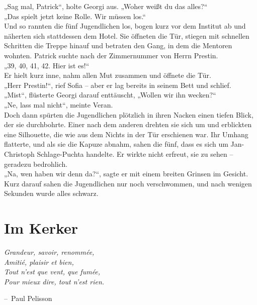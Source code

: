 \documentclass[oneside]{memoir}
\makeatletter
\newenvironment{chapquote}[2][2em]
  {\setlength{\@tempdima}{#1}%
   \def\chapquote@author{#2}%
   \parshape 1 \@tempdima \dimexpr\textwidth-2\@tempdima\relax%
   \itshape}
  {\par\normalfont\hfill--\ \chapquote@author\hspace*{\@tempdima}\par\bigskip}
\makeatother
\begin{document}
„Sag mal, Patrick“, holte Georgi aus. „Woher weißt du das alles?“ \\
„Das spielt jetzt keine Rolle. Wir müssen los.“ \\
Und so rannten die fünf Jugendlichen los, bogen kurz vor dem Institut ab und näherten sich stattdessen dem Hotel. Sie öffneten die Tür, stiegen mit schnellen Schritten die Treppe hinauf und betraten den Gang, in dem die Mentoren wohnten. Patrick suchte nach der Zimmernummer von Herrn Prestin. \\
„39, 40, 41, 42. Hier ist es!“ \\
Er hielt kurz inne, nahm allen Mut zusammen und öffnete die Tür. \\
„Herr Prestin!“, rief Sofia – aber er lag bereits in seinem Bett und schlief. \\
„Mist“, flüsterte Georgi darauf enttäuscht, „Wollen wir ihn wecken?“ \\
„Ne, lass mal nicht“, meinte Veran. \\
Doch dann spürten die Jugendlichen plötzlich in ihren Nacken einen tiefen Blick, der sie durchbohrte. Einer nach dem anderen drehten sie sich um und erblickten eine Silhouette, die wie aus dem Nichts in der Tür erschienen war. Ihr Umhang flatterte, und als sie die Kapuze abnahm, sahen die fünf, dass es sich um Jan-Christoph Schlage-Puchta handelte. Er wirkte nicht erfreut, sie zu sehen – geradezu bedrohlich. \\
„Na, wen haben wir denn da?“, sagte er mit einem breiten Grinsen im Gesicht. Kurz darauf sahen die Jugendlichen nur noch verschwommen, und nach wenigen Sekunden wurde alles schwarz.

     
     
\chapter{Im Kerker} %
\begin{chapquote}{Paul Pelisson}
\glqq Grandeur, savoir, renommée, \\
Amitié, plaisir et bien, \\
Tout n’est que vent, que fumée, \\
Pour mieux dire, tout n’est rien.\grqq
\end{chapquote}
\end{document}

